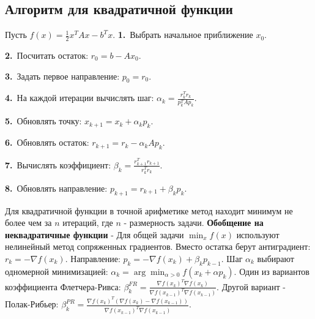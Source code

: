 \documentclass[12pt,a4paper]{article}
\begin{document}
\subsection{Алгоритм для квадратичной функции}
Пусть $f(x)=\frac12 x^TAx-b^Tx.$
\noindent\textbf{1.}\ Выбрать начальное приближение $x_0$.\par
\noindent\textbf{2.}\ Посчитать остаток: $r_0=b-Ax_0.$\par
\noindent\textbf{3.}\ Задать первое направление: $p_0=r_0.$\par
\noindent\textbf{4.}\ На каждой итерации вычислять шаг: $\alpha_k=\frac{r_k^Tr_k}{p_k^TAp_k}.$\par
\noindent\textbf{5.}\ Обновлять точку: $x_{k+1}=x_k+\alpha_k p_k.$\par
\noindent\textbf{6.}\ Обновлять остаток: $r_{k+1}=r_k-\alpha_k A p_k.$\par
\noindent\textbf{7.}\ Вычислять коэффициент: $\beta_k=\frac{r_{k+1}^Tr_{k+1}}{r_k^Tr_k}.$\par
\noindent\textbf{8.}\ Обновлять направление: $p_{k+1}=r_{k+1}+\beta_k p_k.$\par
Для квадратичной функции в точной арифметике метод находит минимум не более чем за $n$ итераций, где $n$ - размерность задачи.
\textbf{Обобщение на неквадратичные функции} - Для общей задачи $\min_x f(x)$
используют нелинейный метод сопряженных градиентов.
Вместо остатка берут антиградиент: $r_k=-\nabla f(x_k).$
Направление: $p_k=-\nabla f(x_k)+\beta_k p_{k-1}.$
Шаг $\alpha_k$ выбирают одномерной минимизацией: $\alpha_k=\arg\min_{\alpha>0} f(x_k+\alpha p_k).$
Один из вариантов коэффициента Флетчера-Ривса: $\beta_k^{FR}= \frac{\nabla f(x_k)^T\nabla f(x_k)} {\nabla f(x_{k-1})^T\nabla f(x_{k-1})}.$
Другой вариант - Полак-Рибьер: $\beta_k^{PR}= \frac{\nabla f(x_k)^T(\nabla f(x_k)-\nabla f(x_{k-1}))} {\nabla f(x_{k-1})^T\nabla f(x_{k-1})}.$
\end{document}
